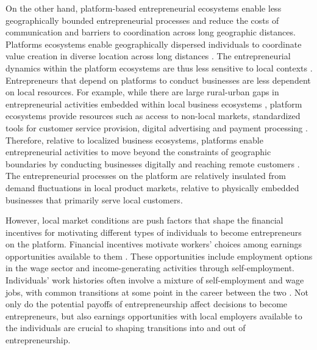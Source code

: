 \documentclass[letterpaper,12pt]{article}
\begin{document}
On the other hand, platform-based entrepreneurial ecosystems enable less geographically bounded entrepreneurial processes and reduce the costs of communication and barriers to coordination across long geographic distances. Platforms ecosystems enable geographically dispersed individuals to coordinate value creation in diverse location across long distances \citep{cennamo_platform_2013,sussan_digital_2017,jacobides_towards_2018}. The entrepreneurial dynamics within the platform ecosystems are thus less sensitive to local contexts \citep{haveman_spatial_2014,autio_digital_2018}. Entrepreneurs that depend on platforms to conduct businesses are less dependent on local resources. For example, while there are large rural-urban gaps in entrepreneurial activities embedded within local business ecosystems \citep{braesemann_icts_2022}, platform ecosystems provide resources such as access to non-local markets, standardized tools for customer service provision, digital advertising and payment processing \citep{forman_how_2005,koo_platform_2021}. Therefore, relative to localized business ecosystems, platforms enable entrepreneurial activities to move beyond the constraints of geographic boundaries by conducting businesses digitally and reaching remote customers \citep{nambisan_digital_2017,autio_digital_2018}. The entrepreneurial processes on the platform are relatively insulated from demand fluctuations in local product markets, relative to physically embedded businesses that primarily serve local customers.
 


However, local market conditions are push factors that shape the financial incentives for motivating different types of individuals to become entrepreneurs on the platform. Financial incentives motivate workers’ choices among earnings opportunities available to them \citep{autio_entrepreneurial_2014,berkhout_entrepreneurship_2016,burton_careers_2016}. These opportunities include employment options in the wage sector and income-generating activities through self-employment. Individuals’ work histories often involve a mixture of self-employment and wage jobs, with common transitions at some point in the career between the two \citep{ferber_long-term_1998,folta_hybrid_2010,dillon_self-employment_2017,ganser-stickler_sitting_2022}. Not only do the potential payoffs of entrepreneurship affect decisions to become entrepreneurs, but also earnings opportunities with local employers available to the individuals are crucial to shaping transitions into and out of entrepreneurship.
\end{document}
